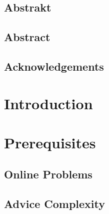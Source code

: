 \documentclass[12pt,a4paper]{report}
\begin{document}
\eject %




\eject

%

\eject

\section*{Abstrakt}


\eject

\section*{Abstract}


\eject

\section*{Acknowledgements}


\eject

\tableofcontents

\listoffigures
\listoftables

\chapter*{Introduction}
\setcounter{page}{1}
\label{chapter:intro}


\chapter{Prerequisites}
\label{chapter:first}

\section{Online Problems}
\label{section:online}

\section{Advice Complexity}
\label{section:advice}

\end{document}
